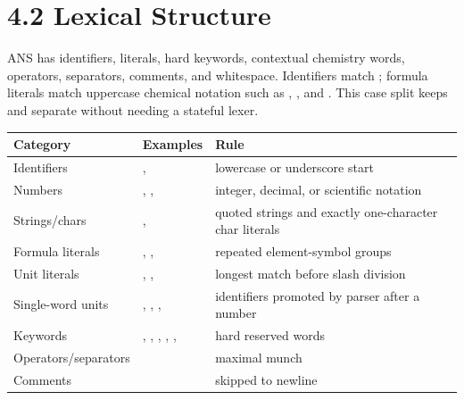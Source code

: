 \newpage
\section{4.2 Lexical Structure}
ANS has identifiers, literals, hard keywords, contextual chemistry words, operators, separators, comments, and whitespace. Identifiers match \code{[a-z\_][A-Za-z0-9\_]*}; formula literals match uppercase chemical notation such as , , and . This case split keeps  and  separate without needing a stateful lexer.

{\footnotesize
\begin{tabularx}{\linewidth}{@{}p{3.1cm}p{3.5cm}Y@{}}
\toprule
Category & Examples & Rule \\
\midrule
Identifiers & ,  & lowercase or underscore start \\
Numbers & , ,  & integer, decimal, or scientific notation \\
Strings/chars & ,  & quoted strings and exactly one-character char literals \\
Formula literals & , ,  & repeated element-symbol groups \\
Unit literals & , ,  & longest match before slash division \\
Single-word units & , , ,  & identifiers promoted by parser after a number \\
Keywords & , , , , ,  & hard reserved words \\
Operators/separators &  & maximal munch \\
Comments &  & skipped to newline \\
\bottomrule
\end{tabularx}}

\newpage
